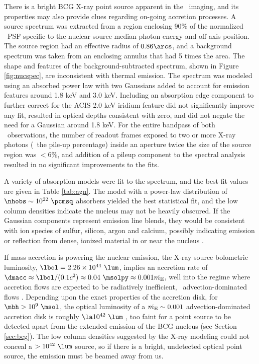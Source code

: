 \documentclass[11pt, preprint]{aastex}
\begin{document}
There is a bright BCG X-ray point source apparent in the
\cxo\ imaging, and its properties may also provide clues regarding
on-going accretion processes. A source spectrum was extracted from a
region enclosing 90\% of the normalized \cxo\ PSF specific to the
nuclear source median photon energy and off-axis position. The source
region had an effective radius of $0.86\arcs$, and a background
spectrum was taken from an enclosing annulus that had 5 times the
area. The shape and features of the background-subtracted spectrum,
shown in Figure \ref{fig:nucspec}, are inconsistent with thermal
emission. The spectrum was modeled using an absorbed power law with
two Gaussians added to account for emission features around 1.8 keV
and 3.0 keV. Including an absorption edge component to further correct
for the ACIS 2.0 keV iridium feature did not significantly improve any
fit, resulted in optical depths consistent with zero, and did not
negate the need for a Gaussian around 1.8 keV. For the entire bandpass
of both \cxo\ observations, the number of readout frames exposed to
two or more X-ray photons (\ie\ the pile-up percentage) inside an
aperture twice the size of the source region was $< 6\%$, and addition
of a pileup component to the spectral analysis resulted in no
significant improvements to the fits.

A variety of absorption models were fit to the spectrum, and the
best-fit values are given in Table \ref{tab:agn}. The model with a
power-law distribution of $\nhobs \sim 10^{22} ~\pcmsq$ absorbers
yielded the best statistical fit, and the low column densities
indicate the nucleus may not be heavily obscured. If the Gaussian
components represent emission line blends, they would be consistent
with ion species of sulfur, silicon, argon and calcium, possibly
indicating emission or reflection from dense, ionized material in or
near the nucleus \citep[\eg][]{1990ApJ...362...90B,
  1998MNRAS.297.1219I}.

If mass accretion is powering the nuclear emission, the X-ray source
bolometric luminosity, $\lbol = 2.26 \times 10^{44} ~\lum$, implies an
accretion rate of $\dmacc \approx \lbol/(0.1 c^2) \approx 0.04
~\msolpy \approx 0.001 \dme$, well into the regime where accretion
flows are expected to be radiatively inefficient,
\eg\ advection-dominated flows \citep{adaf}. Depending upon the exact
properties of the accretion disk, for $\mbh > 10^9 ~\msol$, the
optical luminosity of a $\dot{m_{\rm{E}}} \sim 0.001$ advection-dominated
accretion disk is roughly $\la 10^{42} ~\lum$
\citep{2002ApJ...570L..13C}, too faint for a point source to be
detected apart from the extended emission of the BCG nucleus (see
Section \ref{sec:bcg}). The low column densities suggested by the
X-ray modeling could not conceal a $> 10^{42} ~\lum$ source, so if
there is a bright, undetected optical point source, the emission must
be beamed away from us.
\end{document}
